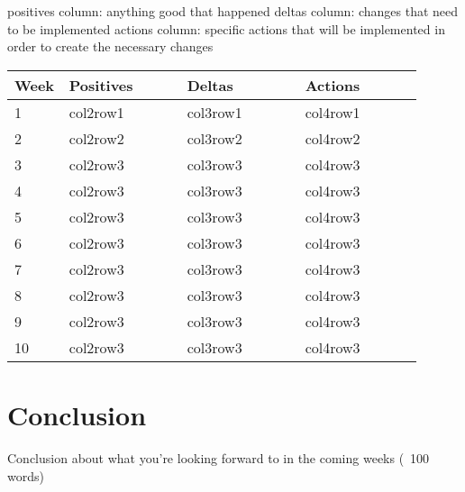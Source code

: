 \documentclass[onecolumn, draftclsnofoot,10pt, compsoc]{IEEEtran}
\begin{document}
positives column: anything good that happened
deltas column: changes that need to be implemented
actions column: specific actions that will be implemented in order to create the necessary changes


\begin{tabular}{|p{0.05\linewidth}|p{0.285\linewidth}|p{0.285\linewidth}|p{0.285\linewidth}|}
\hline
	Week & Positives & Deltas & Actions \\ \hline

	1
	& col2row1
	& col3row1
	& col4row1 \\ \hline

	2
	& col2row2
	& col3row2
	& col4row2  \\ \hline

	3
	& col2row3
	& col3row3
	& col4row3  \\ \hline

	4
	& col2row3
	& col3row3
	& col4row3  \\ \hline

	5
	& col2row3
	& col3row3
	& col4row3  \\ \hline

	6
	& col2row3
	& col3row3
	& col4row3  \\ \hline

	7
	& col2row3
	& col3row3
	& col4row3  \\ \hline

	8
	& col2row3
	& col3row3
	& col4row3  \\ \hline

	9
	& col2row3
	& col3row3
	& col4row3  \\ \hline

	10
	& col2row3
	& col3row3
	& col4row3  \\ \hline

\end{tabular}

\section{Conclusion}
Conclusion about what you’re looking forward to in the coming weeks (~100 words)
\end{document}
